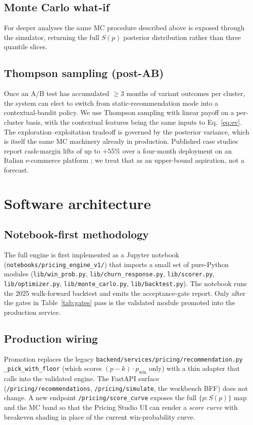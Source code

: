 \documentclass[11pt,a4paper]{article}
\begin{document}
\subsection{Monte Carlo what-if}
For deeper analyses the same MC procedure described above is exposed through the simulator, returning the full $S(p)$ posterior distribution rather than three quantile slices.

\subsection{Thompson sampling (post-AB)}
Once an A/B test has accumulated $\geq 3$ months of variant outcomes per cluster, the system can elect to switch from static-recommendation mode into a contextual-bandit policy. We use Thompson sampling with linear payoff \cite{agrawal2013contextualts} on a per-cluster basis, with the contextual features being the same inputs to Eq.~\ref{eq:ev}. The exploration--exploitation tradeoff is governed by the posterior variance, which is itself the same MC machinery already in production. Published case studies report cash-margin lifts of up to $+55\%$ over a four-month deployment on an Italian e-commerce platform \cite{aziz2018ts}; we treat that as an upper-bound aspiration, not a forecast.

\section{Software architecture}

\subsection{Notebook-first methodology}
The full engine is first implemented as a Jupyter notebook (\texttt{notebooks/pricing\_engine\_v1/}) that imports a small set of pure-Python modules (\texttt{lib/win\_prob.py}, \texttt{lib/churn\_response.py}, \texttt{lib/scorer.py}, \texttt{lib/optimizer.py}, \texttt{lib/monte\_carlo.py}, \texttt{lib/backtest.py}). The notebook runs the 2025 walk-forward backtest and emits the acceptance-gate report. Only after the gates in Table~\ref{tab:gates} pass is the validated module promoted into the production service.

\subsection{Production wiring}
Promotion replaces the legacy \texttt{backend/services/pricing/recommendation.py} \texttt{\_pick\_with\_floor} (which scores $(p - k)\cdot p_{\text{win}}$ only) with a thin adapter that calls into the validated engine. The FastAPI surface (\texttt{/pricing/recommendations}, \texttt{/pricing/simulate}, the workbench BFF) does not change. A new endpoint \texttt{/pricing/score\_curve} exposes the full $\{p : S(p)\}$ map and the MC band so that the Pricing Studio UI can render a \emph{score curve} with breakeven shading in place of the current win-probability curve.
\end{document}
